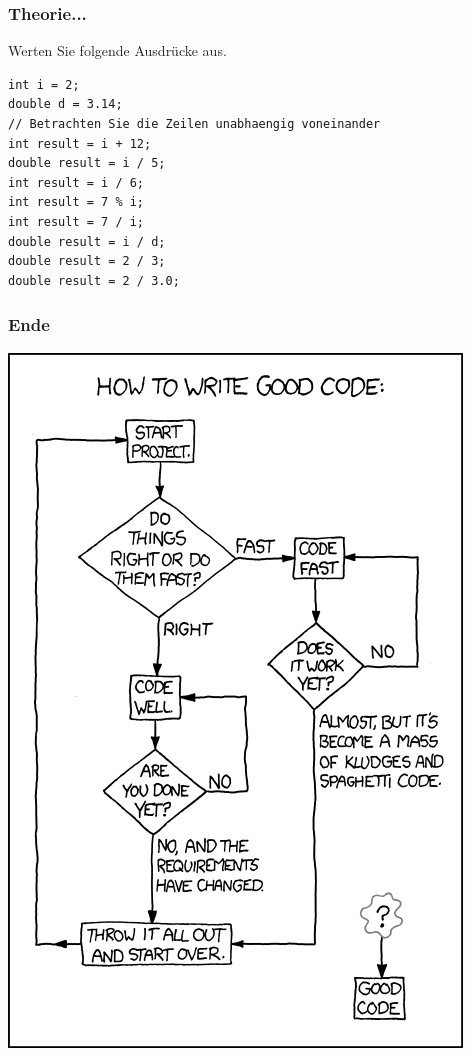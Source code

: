 \documentclass{beamer}
\begin{document}
\begin{frame}[fragile]
\frametitle{Theorie...}
Werten Sie folgende Ausdr\"{u}cke aus.
\begin{verbatim}
int i = 2;
double d = 3.14;
// Betrachten Sie die Zeilen unabhaengig voneinander
int result = i + 12;
double result = i / 5;
int result = i / 6;
int result = 7 % i;
int result = 7 / i;
double result = i / d;
double result = 2 / 3;
double result = 2 / 3.0;
\end{verbatim}
\end{frame}

\begin{frame}
\frametitle{Ende}
\includegraphics[scale=0.25]{good_code.png}
\end{frame}
\end{document}
